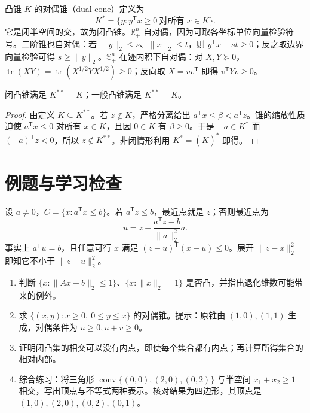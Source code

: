 凸锥 $K$ 的对偶锥（dual cone）定义为
\begin{equation}
 K^*=\{y:y^{\mathsf T}x\geq0\ \text{对所有 }x\in K\}.
 \label{eq:co-dual-cone}
\end{equation}
它是闭半空间的交，故为闭凸锥。$\mathbb R_+^n$ 自对偶，因为可取各坐标单位向量检验符号。二阶锥也自对偶：若 $\|y\|_2\leq s$、$\|x\|_2\leq t$，则 $y^{\mathsf T}x+st\geq0$；反之取边界向量检验可得 $s\geq\|y\|_2$。$\mathbb S_+^n$ 在迹内积下自对偶：对 $X,Y\succeq0$，$\operatorname{tr}(XY)=\operatorname{tr}(X^{1/2}YX^{1/2})\geq0$；反向取 $X=vv^{\mathsf T}$ 即得 $v^{\mathsf T}Yv\geq0$。

\begin{proposition}
闭凸锥满足 $K^{**}=K$；一般凸锥满足 $K^{**}=\overline K$。
\end{proposition}
\begin{proof}
由定义 $K\subseteq K^{**}$。若 $z\notin K$，严格分离给出 $a^{\mathsf T}x\leq\beta<a^{\mathsf T}z$。锥的缩放性质迫使 $a^{\mathsf T}x\leq0$ 对所有 $x\in K$，且因 $0\in K$ 有 $\beta\geq0$。于是 $-a\in K^*$ 而 $(-a)^{\mathsf T}z<0$，所以 $z\notin K^{**}$。非闭情形利用 $K^*=(\overline K)^*$ 即得。
\end{proof}

\section{例题与学习检查}
\begin{example}[到半空间的投影]
设 $a\ne0$，$C=\{x:a^{\mathsf T}x\leq b\}$。若 $a^{\mathsf T}z\leq b$，最近点就是 $z$；否则最近点为
\[
 u=z-\frac{a^{\mathsf T}z-b}{\|a\|_2^2}a.
\]
事实上 $a^{\mathsf T}u=b$，且任意可行 $x$ 满足 $(z-u)^{\mathsf T}(x-u)\leq0$。展开 $\|z-x\|_2^2$ 即知它不小于 $\|z-u\|_2^2$。
\end{example}
\begin{enumerate}
 \item 判断 $\{x:\|Ax-b\|_2\leq1\}$、$\{x:\|x\|_2=1\}$ 是否凸，并指出退化维数可能带来的例外。
 \item 求 $\{(x,y):x\geq0,\ 0\leq y\leq x\}$ 的对偶锥。提示：原锥由 $(1,0),(1,1)$ 生成，对偶条件为 $u\geq0,u+v\geq0$。
 \item 证明闭凸集的相交可以没有内点，即使每个集合都有内点；再计算所得集合的相对内部。
 \item 综合练习：将三角形 $\operatorname{conv}\{(0,0),(2,0),(0,2)\}$ 与半空间 $x_1+x_2\geq1$ 相交，写出顶点与不等式两种表示。核对结果为四边形，其顶点是 $(1,0),(2,0),(0,2),(0,1)$。
\end{enumerate}


